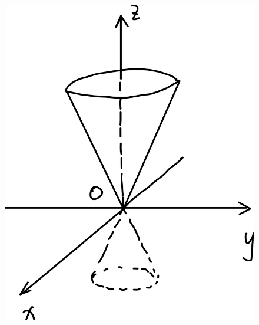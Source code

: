 \documentclass[12pt, a4paper]{article}
\numberwithin{equation}{section}
\begin{document}
\begin{figure}[htbp]
{\begin{minipage}[b]{.3\linewidth}
                \includegraphics[scale=0.08]{"Chapter 08 images/pic5.png"}
            \end{minipage}
        }
    \end{figure}
\end{document}
